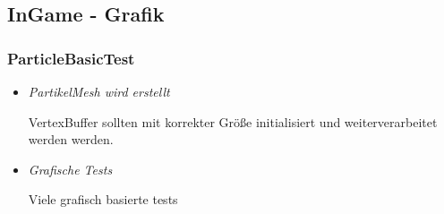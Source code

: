 \subsection{InGame - Grafik}

\subsubsection{ParticleBasicTest}

\begin{itemize}
    \item \textit{PartikelMesh wird erstellt}
        \begin{leftbar}[0.9\linewidth]
            VertexBuffer sollten mit korrekter Größe initialisiert und
            weiterverarbeitet werden werden.
        \end{leftbar}
    \item \textit{Grafische Tests}
        \begin{leftbar}[0.9\linewidth]
            Viele grafisch basierte tests
        \end{leftbar}
\end{itemize}